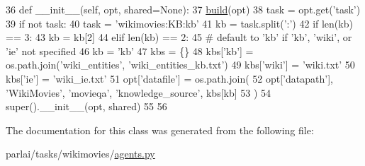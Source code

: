 \begin{DoxyCode}
36     \textcolor{keyword}{def }\_\_init\_\_(self, opt, shared=None):
37         \hyperlink{namespaceparlai_1_1mturk_1_1tasks_1_1talkthewalk_1_1download_a8c0fbb9b6dfe127cb8c1bd6e7c4e33fd}{build}(opt)
38         task = opt.get(\textcolor{stringliteral}{'task'})
39         \textcolor{keywordflow}{if} \textcolor{keywordflow}{not} task:
40             task = \textcolor{stringliteral}{'wikimovies:KB:kb'}
41         kb = task.split(\textcolor{stringliteral}{':'})
42         \textcolor{keywordflow}{if} len(kb) == 3:
43             kb = kb[2]
44         \textcolor{keywordflow}{elif} len(kb) == 2:
45             \textcolor{comment}{# default to 'kb' if 'kb', 'wiki', or 'ie' not specified}
46             kb = \textcolor{stringliteral}{'kb'}
47         kbs = \{\}
48         kbs[\textcolor{stringliteral}{'kb'}] = os.path.join(\textcolor{stringliteral}{'wiki\_entities'}, \textcolor{stringliteral}{'wiki\_entities\_kb.txt'})
49         kbs[\textcolor{stringliteral}{'wiki'}] = \textcolor{stringliteral}{'wiki.txt'}
50         kbs[\textcolor{stringliteral}{'ie'}] = \textcolor{stringliteral}{'wiki\_ie.txt'}
51         opt[\textcolor{stringliteral}{'datafile'}] = os.path.join(
52             opt[\textcolor{stringliteral}{'datapath'}], \textcolor{stringliteral}{'WikiMovies'}, \textcolor{stringliteral}{'movieqa'}, \textcolor{stringliteral}{'knowledge\_source'}, kbs[kb]
53         )
54         super().\_\_init\_\_(opt, shared)
55 
56 
\end{DoxyCode}


The documentation for this class was generated from the following file\+:\begin{DoxyCompactItemize}
\item 
parlai/tasks/wikimovies/\hyperlink{parlai_2tasks_2wikimovies_2agents_8py}{agents.\+py}\end{DoxyCompactItemize}
